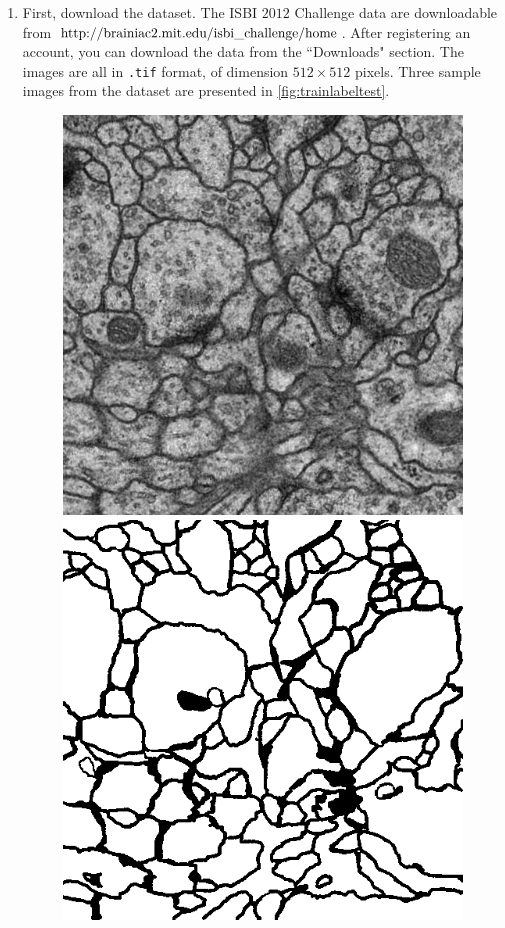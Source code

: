 \documentclass[12pt]{article}
\newcommand{\txt}[1]
{\textnormal{#1}}
\begin{document}
\begin{enumerate}

\item First, download the dataset. The ISBI $2012$ Challenge data are downloadable from \href{http://brainiac2.mit.edu/isbi_challenge/home}{$\txt{http://brainiac2.mit.edu/isbi\_challenge/home}$}. After registering an account, you can download the data from the ``Downloads" section. The images are all in \texttt{.tif} format, of dimension $512 \times 512$ pixels. Three sample images from the dataset are presented in \autoref{fig:trainlabeltest}. 
\begin{figure}
\includegraphics[scale=0.2]{trainvolume}
\includegraphics[scale=0.2]{trainlabels}

\end{figure}
\end{enumerate}
\end{document}

